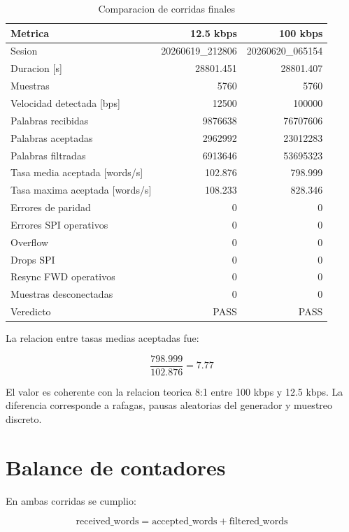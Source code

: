 \documentclass[12pt,a4paper,oneside]{report}
\begin{document}
\begin{table}[H]
\centering
\caption{Comparacion de corridas finales}
\begin{tabular}{lrr}
\toprule
Metrica & 12.5 kbps & 100 kbps \\
\midrule
Sesion & \multicolumn{1}{c}{20260619\_212806} & \multicolumn{1}{c}{20260620\_065154} \\
Duracion [s] & 28801.451 & 28801.407 \\
Muestras & 5760 & 5760 \\
Velocidad detectada [bps] & 12500 & 100000 \\
Palabras recibidas & 9876638 & 76707606 \\
Palabras aceptadas & 2962992 & 23012283 \\
Palabras filtradas & 6913646 & 53695323 \\
Tasa media aceptada [words/s] & 102.876 & 798.999 \\
Tasa maxima aceptada [words/s] & 108.233 & 828.346 \\
Errores de paridad & 0 & 0 \\
Errores SPI operativos & 0 & 0 \\
Overflow & 0 & 0 \\
Drops SPI & 0 & 0 \\
Resync FWD operativos & 0 & 0 \\
Muestras desconectadas & 0 & 0 \\
Veredicto & PASS & PASS \\
\bottomrule
\end{tabular}
\end{table}

La relacion entre tasas medias aceptadas fue:

\begin{equation}
\frac{798.999}{102.876} = 7.77
\end{equation}

El valor es coherente con la relacion teorica 8:1 entre 100 kbps y 12.5 kbps.
La diferencia corresponde a rafagas, pausas aleatorias del generador y muestreo
discreto.

\section{Balance de contadores}

En ambas corridas se cumplio:

\begin{equation}
\text{received\_words} =
\text{accepted\_words} + \text{filtered\_words}
\end{equation}
\end{document}

